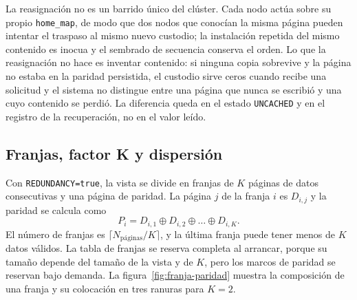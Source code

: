 La reasignación no es un barrido único del clúster. Cada nodo actúa sobre su propio \texttt{home\_map}, de modo que dos nodos que conocían la misma página pueden intentar el traspaso al mismo nuevo custodio; la instalación repetida del mismo contenido es inocua y el sembrado de secuencia conserva el orden. Lo que la reasignación no hace es inventar contenido: si ninguna copia sobrevive y la página no estaba en la paridad persistida, el custodio sirve ceros cuando recibe una solicitud y el sistema no distingue entre una página que nunca se escribió y una cuyo contenido se perdió. La diferencia queda en el estado \texttt{UNCACHED} y en el registro de la recuperación, no en el valor leído.

\subsection{Franjas, factor K y dispersión}

Con \texttt{REDUNDANCY=true}, la vista se divide en franjas de $K$ páginas de datos consecutivas y una página de paridad. La página $j$ de la franja $i$ es $D_{i,j}$ y la paridad se calcula como
\begin{equation}
P_i = D_{i,1} \oplus D_{i,2} \oplus \dots \oplus D_{i,K}.
\end{equation}
El número de franjas es $\lceil N_{\text{páginas}} / K \rceil$, y la última franja puede tener menos de $K$ datos válidos. La tabla de franjas se reserva completa al arrancar, porque su tamaño depende del tamaño de la vista y de $K$, pero los marcos de paridad se reservan bajo demanda. La figura~\ref{fig:franja-paridad} muestra la composición de una franja y su colocación en tres ranuras para $K=2$.

